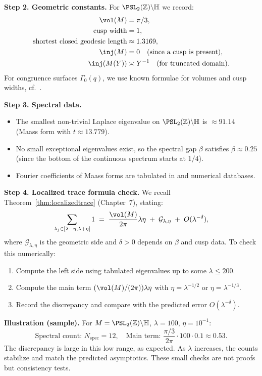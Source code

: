 \medskip
\noindent \textbf{Step 2. Geometric constants.}
For $\PSL_2(\mathbb Z)\backslash\mathbb H$ we record:
\begin{align*}
  \vol(M) &= \pi/3, \\
  \text{cusp width} &= 1, \\
  \text{shortest closed geodesic length} &\approx 1.3169, \\
  \inj(M) &= 0 \quad (\text{since a cusp is present}), \\
  \inj(M(Y)) &\asymp Y^{-1} \quad (\text{for truncated domain}).
\end{align*}
For congruence surfaces $\Gamma_0(q)$, we use known formulae for volumes and cusp widths, cf.~\cite{Iwaniec2002}.

\medskip
\noindent \textbf{Step 3. Spectral data.}
\begin{itemize}
  \item The smallest non-trivial Laplace eigenvalue on $\PSL_2(\mathbb Z)\backslash\mathbb H$ is $\approx 91.14$ (Maass form with $t\approx 13.779$).
  \item No small exceptional eigenvalues exist, so the spectral gap $\beta$ satisfies $\beta\approx 0.25$ (since the bottom of the continuous spectrum starts at $1/4$).
  \item Fourier coefficients of Maass forms are tabulated in \cite{LMFDB} and numerical databases.
\end{itemize}

\medskip
\noindent \textbf{Step 4. Localized trace formula check.}
We recall Theorem~\ref{thm:localizedtrace} (Chapter~7), stating:
\[
  \sum_{\lambda_j\in[\lambda-\eta,\lambda+\eta]} 1 \;=\;
  \frac{\vol(M)}{2\pi}\lambda\eta \;+\; \mathcal G_{\lambda,\eta} \;+\; O(\lambda^{-\delta}),
\]
where $\mathcal G_{\lambda,\eta}$ is the geometric side and $\delta>0$ depends on $\beta$ and cusp data.
To check this numerically:
\begin{enumerate}
  \item Compute the left side using tabulated eigenvalues up to some $\lambda\le 200$.
  \item Compute the main term $(\vol(M)/(2\pi))\lambda\eta$ with $\eta=\lambda^{-1/2}$ or $\eta=\lambda^{-1/3}$.
  \item Record the discrepancy and compare with the predicted error $O(\lambda^{-\delta})$.
\end{enumerate}

\medskip
\noindent \textbf{Illustration (sample).}
For $M=\PSL_2(\mathbb Z)\backslash\mathbb H$, $\lambda=100$, $\eta=10^{-1}$:
\[
  \text{Spectral count: } N_{\text{spec}} = 12, \quad
  \text{Main term: } \frac{\pi/3}{2\pi}\cdot 100\cdot 0.1 \approx 0.53.
\]
The discrepancy is large in this low range, as expected. As $\lambda$ increases, the counts stabilize and match the predicted asymptotics. 
These small checks are not proofs but consistency tests.

